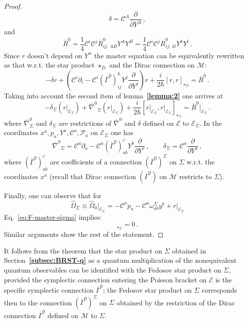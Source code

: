 \documentclass[a4paper,11pt]{amsart}
\numberwithin{thm}{section} %
\numberwithin{equation}{section} %
\numberwithin{figure}{section} %
\newcommand{\bref}[1]{{\bf \ref{#1}}}
\newcommand{\commut}[2]{[#1,#2]}
\renewcommand{\:}{{\rm\, :\,}}
\def\bar{\overline}
\def\d{\partial}
\newcommand{\dl}[1]{\displaystyle\frac{{\d}}{\d #1}}
\def\cP{{\mathcal P}}
\def\cc{{\mathcal C}}
\def\manM{{\mathcal M}}
\def\E{{ \mathcal E}}
\def\con{{\bar\Gamma}}
\def\Dcon-d{{\bar\nabla}^0}
\begin{document}
\begin{proof}
\begin{equation}
\delta=\cc^A\dl{Y^A}\,,
\end{equation}
and
\begin{equation}
  {\bar R}^0=
\frac{1}{4} \cc^i \cc^j  {\bar R}^0_{ij;\, A B} Y^A Y^B=
\frac{1}{4} \cc^i \cc^j  {\bar R}^0_{ij;\, kl} Y^k Y^l \,.
\end{equation}
Since $r$ doesn't depend on $Y^\alpha$ the master equation can be
equivalently rewritten as that w.r.t. the star product $\star_D$
and the Dirac connection on $\manM$:
\begin{equation}
-\delta r+(\cc^i\d_i-
\cc^i (\con^0)^k_{ij}Y^j\dl{Y^j})r+
\frac{i}{2\hbar}\commut{r}{r}_{\star_D}={\bar R}^0\,.
\end{equation}
Taking into account the second item of lemma~\bref{lemma:2}
one arrives at
\begin{equation}
\label{eq:F-master-sigma}
-\delta_{\Sigma}(r{\bigr|}_{\E_\Sigma})
+{\Dcon-d}_{\Sigma}(r{\bigr|}_{\E_\Sigma})
+\frac{i}{2\hbar}\commut{r{\bigr|}_{\E_\Sigma}}{r{\bigr|}_{\E_\Sigma}}_{\star_{\Sigma}}
={\bar R}^0{\bigr|}_{\E_\Sigma}\,.
\end{equation}
where $\Dcon-d_{\Sigma}$ and $\delta_{\Sigma}$ are restrictions
of $\Dcon-d$ and $\delta$ defined on $\E$ to ${\E_\Sigma}$. In the
coordinates $x^a,p_a,Y^a,\cc^a,\cP_a$ on $\E_{\Sigma}$ one has
\begin{equation}
{\Dcon-d}_{\Sigma}=\cc^a\d_a-\cc^a (\con^0)^c_{ab}Y^b\dl{Y^c}\,,
\qquad \delta_{\Sigma}=\cc^a \dl{Y^a}\,,
\end{equation}
where $(\con^0)^c_{ab}$ are coefficients of a connection $(\con^0)^\Sigma$ on
$\Sigma$  w.r.t. the coordinates $x^a$ (recall that Dirac connection
$(\con^0)$ on $\manM$ restricts to $\Sigma$).

Finally, one can observe that
for
\begin{equation}
{\hat\Omega}_\Sigma\equiv{\hat\Omega_0}{\bigr|}_{\E_\Sigma}=
-\cc^ap_a-\cc^a \omega^\Sigma_{ab}y^b+r{\bigr|}_{\E_\Sigma}
  \end{equation}
Eq.~\eqref{eq:F-master-sigma} implies:
\begin{equation}
  \commut{{\hat\Omega}_\Sigma}{{\hat\Omega}_\Sigma}_{\star_\Sigma}=0\,.
\end{equation}
Similar arguments show the rest of the statement.
\end{proof}
It follows from the theorem that the star product on $\Sigma$ obtained
in Section~\bref{subsec:BRST-q} as a quantum multiplication
of the nonequivalent quantum observables can be identified with
the Fedosov star product on $\Sigma$, provided
the symplectic connection entering the Poisson bracket on $\E$
is the specific symplectic connection $\con^0$; the Fedosov star
product on $\Sigma$ corresponds then to the connection
$(\con^0)^\Sigma$ on $\Sigma$
obtained by the restriction of the Dirac connection $\con^0$
defined on $\manM$ to $\Sigma$.
\end{document}
